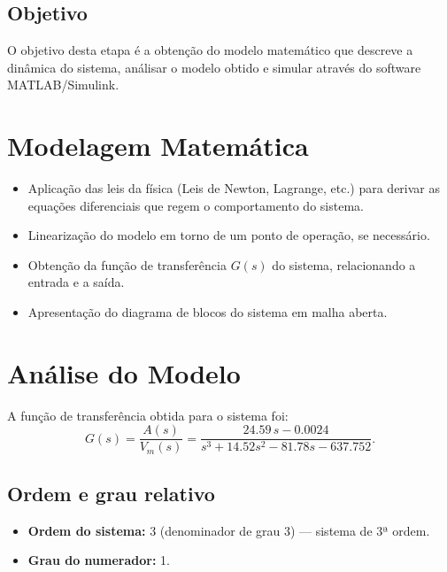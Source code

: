 \documentclass[9pt,a4paper,twocolumn,twoside]{tau-class/tau}
\begin{document}
\subsection{Objetivo}
O objetivo desta etapa é a obtenção do modelo matemático que descreve a dinâmica do sistema, 
análisar o modelo obtido e simular através do software MATLAB/Simulink.

\section{Modelagem Matemática}
\begin{itemize}
    \item Aplicação das leis da física (Leis de Newton, Lagrange, etc.) para derivar as equações diferenciais que regem o comportamento do sistema.
    \item Linearização do modelo em torno de um ponto de operação, se necessário.
    \item Obtenção da função de transferência $G(s)$ do sistema, relacionando a entrada e a saída.
    \item Apresentação do diagrama de blocos do sistema em malha aberta.
\end{itemize}

\section{Análise do Modelo}

A função de transferência obtida para o sistema foi:
\begin{equation}
    G(s)=\frac{A(s)}{V_m(s)}=\frac{24.59\,s - 0.0024}{s^3 + 14.52s^2 - 81.78s - 637.752}.
\end{equation}

\subsection{Ordem e grau relativo}
\begin{itemize}
    \item \textbf{Ordem do sistema:} 3 (denominador de grau 3) — sistema de 3ª ordem.
    \item \textbf{Grau do numerador:} 1.
\end{itemize}
\end{document}
